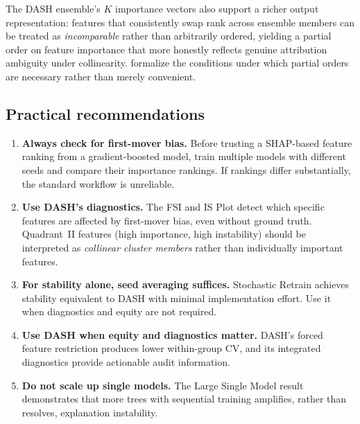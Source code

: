 \documentclass[10pt]{article}
\newcommand{\dash}{\textsc{DASH}}
\begin{document}
The \dash{} ensemble's $K$ importance vectors also support a richer
output representation: features that consistently swap rank across
ensemble members can be treated as \emph{incomparable} rather than
arbitrarily ordered, yielding a partial order on feature importance
that more honestly reflects genuine attribution ambiguity under
collinearity. \citet{caraker2026impossibility} formalize the conditions
under which partial orders are necessary rather than merely convenient.

\subsection{Practical recommendations}

\begin{enumerate}
  \item \textbf{Always check for first-mover bias.} Before trusting a
    SHAP-based feature ranking from a gradient-boosted model, train
    multiple models with different seeds and compare their importance
    rankings. If rankings differ substantially, the standard workflow
    is unreliable.
  \item \textbf{Use \dash{}'s diagnostics.} The FSI and IS Plot detect
    which specific features are affected by first-mover bias, even
    without ground truth. Quadrant~II features (high importance, high
    instability) should be interpreted as \emph{collinear cluster
    members} rather than individually important features.
  \item \textbf{For stability alone, seed averaging suffices.}
    Stochastic Retrain achieves stability equivalent to \dash{} with
    minimal implementation effort. Use it when diagnostics and equity
    are not required.
  \item \textbf{Use \dash{} when equity and diagnostics matter.}
    \dash{}'s forced feature restriction produces lower within-group
    CV, and its integrated diagnostics provide actionable audit
    information.
  \item \textbf{Do not scale up single models.} The Large Single Model
    result demonstrates that more trees with sequential training
    amplifies, rather than resolves, explanation instability.
\end{enumerate}
\end{document}
